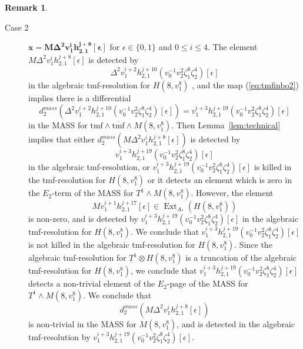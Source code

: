 \documentclass[10pt]{amsart}
\newcommand{\ul}[1]{\underline{#1}}
\newcommand{\br}[1]{\overline{#1}}
\newcommand{\tmf}{\mathrm{tmf}}
\theoremstyle{definition}
\newtheorem{rmk}[equation]{Remark}
\numberwithin{equation}{section}
\numberwithin{figure}{section}
\DeclareMathOperator{\Ext}{Ext}
\begin{document}
\begin{rmk}
\begin{description}
\item[Case 2] $\pmb{x = M \Delta^2 v_1^i h_{2,1}^{j+8}[\epsilon]}$ for $\epsilon \in \{0,1\}$ and $0 \le i \le 4$.  The element $M \Delta^2 v_1^i h_{2,1}^{j+8}[\epsilon]$ is detected by 
$$ \Delta^2 v_1^{i+2} h^{j+10}_{2,1}(v_0^{-1}v_2^2\zeta_1^8\zeta_2^4)[\epsilon] $$
in the algebraic tmf-resolution for $H(8,v_1^8)$ , and the map (\ref{eq:tmfinbo2}) implies there is a differential
$$ d^{mass}_2(\Delta^2 v_1^{i+2} h^{j+10}_{2,1}(v_0^{-1}v_2^2\zeta_1^8\zeta_2^4)[\epsilon]) = 
v_1^{i+3} h^{j+19}_{2,1}(v_0^{-1}v_2^2\zeta_1^8\zeta_2^4)[\epsilon] $$
in the MASS for $\tmf \wedge \br{\tmf} \wedge M(8,v_1^8)$.  Then Lemma~\ref{lem:technical} implies that either $d^{mass}_2(M \Delta^2 v_1^i h_{2,1}^{j+8}[\epsilon])$ is detected by
$$ v_1^{i+3} h^{j+19}_{2,1}(v_0^{-1}v_2^2\zeta_1^8\zeta_2^4)[\epsilon] $$
in the algebraic tmf-resolution, or $v_1^{i+3} h^{j+19}_{2,1}(v_0^{-1}v_2^2\zeta_1^8\zeta_2^4)[\epsilon]$ is killed in the tmf-resolution for $H(8,v_1^8)$ or it detects an element which is zero in the $E_2$-term of the MASS for $T^1 \wedge M(8,v_1^8)$.  However, the element
$$ M v^{i+1}_1 h_{2,1}^{j+17}[\epsilon] \in \Ext_{A_*}(H(8,v_1^8)) $$
is non-zero, and is detected by $v_1^{i+3} h^{j+19}_{2,1}(v_0^{-1}v_2^2\zeta_1^8\zeta_2^4)[\epsilon]$ in the algebraic tmf-resolution for $H(8,v_1^8)$.  We conclude that $v_1^{i+3} h^{j+19}_{2,1}(v_0^{-1}v_2^2\zeta_1^8\zeta_2^4)[\epsilon]$ is not killed in the algebraic tmf-resolution for $H(8,v_1^8)$.  Since the algebraic tmf-resolution for $\ul{T}^1\otimes H(8,v_1^8)$ is a truncation of the algebraic tmf-resolution for $H(8,v_1^8)$, we conclude that $v_1^{i+3} h^{j+19}_{2,1}(v_0^{-1}v_2^2\zeta_1^8\zeta_2^4)[\epsilon]$ detects a non-trivial element of the $E_2$-page of the MASS for $T^1 \wedge M(8,v_1^8)$.  We conclude that 
$$ d^{mass}_2(M \Delta^2 v_1^i h_{2,1}^{j+8}[\epsilon])$$
is non-trivial in the MASS for $M(8,v_1^8)$, and is detected in the algebraic tmf-resolution by $v_1^{i+3} h^{j+19}_{2,1}(v_0^{-1}v_2^2\zeta_1^8\zeta_2^4)[\epsilon]$.
\end{description}
\end{rmk}
\end{document}
